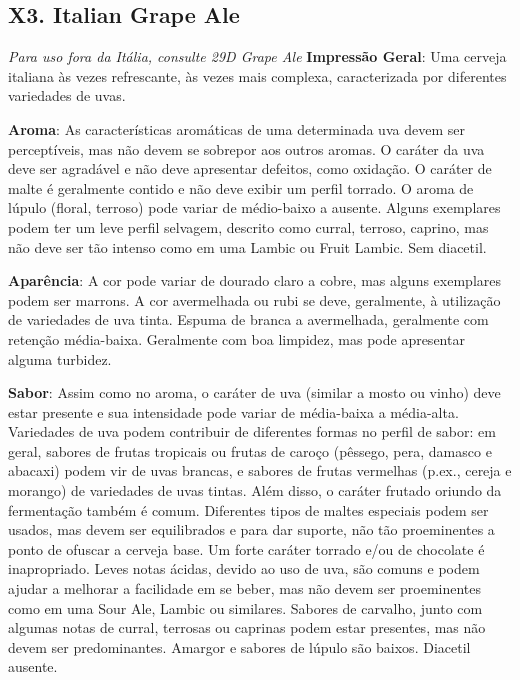 \subsection*{X3. Italian Grape Ale}

\textit{Para uso fora da Itália, consulte 29D Grape Ale}
\textbf{Impressão Geral}: Uma cerveja italiana às vezes refrescante, às vezes mais complexa, caracterizada por diferentes variedades de uvas.

\textbf{Aroma}: As características aromáticas de uma determinada uva devem ser perceptíveis, mas não devem se sobrepor aos outros aromas. O caráter da uva deve ser agradável e não deve apresentar defeitos, como oxidação. O caráter de malte é geralmente contido e não deve exibir um perfil torrado. O aroma de lúpulo (floral, terroso) pode variar de médio-baixo a ausente. Alguns exemplares podem ter um leve perfil selvagem, descrito como curral, terroso, caprino, mas não deve ser tão intenso como em uma Lambic ou Fruit Lambic. Sem diacetil.

\textbf{Aparência}: A cor pode variar de dourado claro a cobre, mas alguns exemplares podem ser marrons. A cor avermelhada ou rubi se deve, geralmente, à utilização de variedades de uva tinta. Espuma de branca a avermelhada, geralmente com retenção média-baixa. Geralmente com boa limpidez, mas pode apresentar alguma turbidez.

\textbf{Sabor}: Assim como no aroma, o caráter de uva (similar a mosto ou vinho) deve estar presente e sua intensidade pode variar de média-baixa a média-alta. Variedades de uva podem contribuir de diferentes formas no perfil de sabor: em geral, sabores de frutas tropicais ou frutas de caroço (pêssego, pera, damasco e abacaxi) podem vir de uvas brancas, e sabores de frutas vermelhas (p.ex., cereja e morango) de variedades de uvas tintas. Além disso, o caráter frutado oriundo da fermentação também é comum. Diferentes tipos de maltes especiais podem ser usados, mas devem ser equilibrados e para dar suporte, não tão proeminentes a ponto de ofuscar a cerveja base. Um forte caráter torrado e/ou de chocolate é inapropriado. Leves notas ácidas, devido ao uso de uva, são comuns e podem ajudar a melhorar a facilidade em se beber, mas não devem ser proeminentes como em uma Sour Ale, Lambic ou similares. Sabores de carvalho, junto com algumas notas de curral, terrosas ou caprinas podem estar presentes, mas não devem ser predominantes. Amargor e sabores de lúpulo são baixos. Diacetil ausente.

